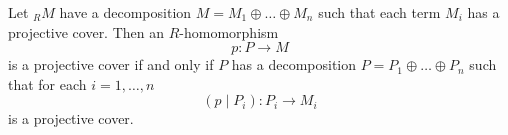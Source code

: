 Let ${}_R M$ have a decomposition $M = M_1 \oplus \ldots \oplus M_n$ such that each term $M_i$ has a projective cover. Then an $R$-homomorphism
$$p: P \rightarrow M$$
is a projective cover if and only if $P$ has a decomposition $P = P_1 \oplus \ldots \oplus P_n$ such that for each $i = 1, \ldots, n$
$$(p \mid P_i): P_i \rightarrow M_i$$
is a projective cover.
